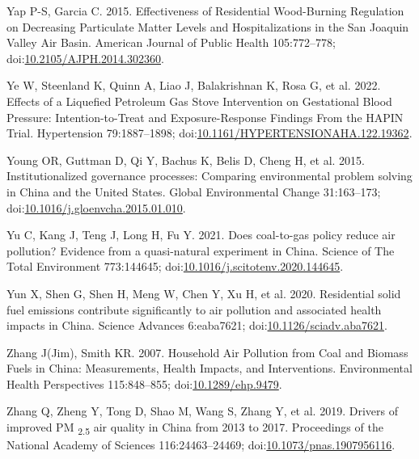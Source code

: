 \documentclass[
  letterpaper,
  DIV=11,
  numbers=noendperiod]{scrartcl}
\newlength{\cslhangindent}
\newenvironment{CSLReferences}[2] %
 {\begin{list}{}{%
  \setlength{\itemindent}{0pt}
  \setlength{\leftmargin}{0pt}
  \setlength{\parsep}{0pt}
  \ifodd #1
   \setlength{\leftmargin}{\cslhangindent}
   \setlength{\itemindent}{-1\cslhangindent}
  \fi
  \setlength{\itemsep}{#2\baselineskip}}}
 {\end{list}}
\begin{document}
\begin{CSLReferences}{1}{1}
Yap P-S, Garcia C. 2015. Effectiveness of {Residential Wood-Burning
Regulation} on {Decreasing Particulate Matter Levels} and
{Hospitalizations} in the {San Joaquin Valley Air Basin}. American
Journal of Public Health 105:772--778;
doi:\href{https://doi.org/10.2105/AJPH.2014.302360}{10.2105/AJPH.2014.302360}.

Ye W, Steenland K, Quinn A, Liao J, Balakrishnan K, Rosa G, et al. 2022.
Effects of a {Liquefied Petroleum Gas Stove Intervention} on
{Gestational Blood Pressure}: {Intention-to-Treat} and
{Exposure-Response Findings From} the {HAPIN Trial}. Hypertension
79:1887--1898;
doi:\href{https://doi.org/10.1161/HYPERTENSIONAHA.122.19362}{10.1161/HYPERTENSIONAHA.122.19362}.

Young OR, Guttman D, Qi Y, Bachus K, Belis D, Cheng H, et al. 2015.
Institutionalized governance processes: {Comparing} environmental
problem solving in {China} and the {United States}. Global Environmental
Change 31:163--173;
doi:\href{https://doi.org/10.1016/j.gloenvcha.2015.01.010}{10.1016/j.gloenvcha.2015.01.010}.

Yu C, Kang J, Teng J, Long H, Fu Y. 2021. Does coal-to-gas policy reduce
air pollution? {Evidence} from a quasi-natural experiment in {China}.
Science of The Total Environment 773:144645;
doi:\href{https://doi.org/10.1016/j.scitotenv.2020.144645}{10.1016/j.scitotenv.2020.144645}.

Yun X, Shen G, Shen H, Meng W, Chen Y, Xu H, et al. 2020. Residential
solid fuel emissions contribute significantly to air pollution and
associated health impacts in {China}. Science Advances 6:eaba7621;
doi:\href{https://doi.org/10.1126/sciadv.aba7621}{10.1126/sciadv.aba7621}.

Zhang J(Jim), Smith KR. 2007. Household {Air Pollution} from {Coal} and
{Biomass Fuels} in {China}: {Measurements}, {Health Impacts}, and
{Interventions}. Environmental Health Perspectives 115:848--855;
doi:\href{https://doi.org/10.1289/ehp.9479}{10.1289/ehp.9479}.

Zhang Q, Zheng Y, Tong D, Shao M, Wang S, Zhang Y, et al. 2019. Drivers
of improved {PM} {\textsubscript{2.5}} air quality in {China} from 2013
to 2017. Proceedings of the National Academy of Sciences
116:24463--24469;
doi:\href{https://doi.org/10.1073/pnas.1907956116}{10.1073/pnas.1907956116}.


\end{CSLReferences}
\end{document}

